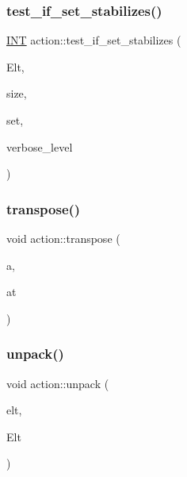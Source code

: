 \mbox{\label{classaction_a5e3d067faffbeb9cc9883afed3ab7b5f}} 
\subsubsection{\texorpdfstring{test\+\_\+if\+\_\+set\+\_\+stabilizes()}{test\_if\_set\_stabilizes()}}
{\footnotesize\ttfamily \mbox{\hyperlink{galois_8h_a09fddde158a3a20bd2dcadb609de11dc}{I\+NT}} action\+::test\+\_\+if\+\_\+set\+\_\+stabilizes (\begin{DoxyParamCaption}\item[{\mbox{\hyperlink{galois_8h_a09fddde158a3a20bd2dcadb609de11dc}{I\+NT}} $\ast$}]{Elt,  }\item[{\mbox{\hyperlink{galois_8h_a09fddde158a3a20bd2dcadb609de11dc}{I\+NT}}}]{size,  }\item[{\mbox{\hyperlink{galois_8h_a09fddde158a3a20bd2dcadb609de11dc}{I\+NT}} $\ast$}]{set,  }\item[{\mbox{\hyperlink{galois_8h_a09fddde158a3a20bd2dcadb609de11dc}{I\+NT}}}]{verbose\+\_\+level }\end{DoxyParamCaption})}

\mbox{\label{classaction_a6031035884cce76529dc06d3f7857b47}} 
\subsubsection{\texorpdfstring{transpose()}{transpose()}}
{\footnotesize\ttfamily void action\+::transpose (\begin{DoxyParamCaption}\item[{void $\ast$}]{a,  }\item[{void $\ast$}]{at }\end{DoxyParamCaption})}

\mbox{\label{classaction_a39cde69999e8f3aff65a824ada8f1601}} 
\subsubsection{\texorpdfstring{unpack()}{unpack()}}
{\footnotesize\ttfamily void action\+::unpack (\begin{DoxyParamCaption}\item[{void $\ast$}]{elt,  }\item[{void $\ast$}]{Elt }\end{DoxyParamCaption})}

